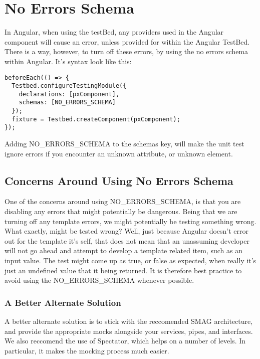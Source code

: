 \chapter{ No Errors Schema }

In Angular, when using the testBed, any providers used in the Angular component
will cause an error, unless provided for within the Angular TestBed. There is a
way, however, to turn off these errors, by using the no errors schema within
Angular. It's syntax look like this:
\begin{lstlisting}
beforeEach(() => {
  Testbed.configureTestingModule({
    declarations: [pxComponent],
    schemas: [NO_ERRORS_SCHEMA]
  });
  fixture = Testbed.createComponent(pxComponent);
});
\end{lstlisting}

Adding NO_ERRORS_SCHEMA to the schemas key, will make the unit test ignore
errors if you encounter an unknown attribute, or unknown element.

\section{ Concerns Around Using No Errors Schema }
One of the concerns around using NO_ERRORS_SCHEMA, is that you are disabling
any errors that might potentially be dangerous. Being that we are turning off
any template errors, we might potentially be testing something wrong. What
exactly, might be tested wrong? Well, just because Angular doesn't error out
for the template it's self, that does not mean that an unassuming developer
will not go ahead and attempt to develop a template related item, such as an
input value. The test might come up as true, or false as expected, when really it's just an undefined value that it being returned. It is therefore best practice to avoid using the NO_ERRORS_SCHEMA whenever possible.

\subsection{A Better Alternate Solution}
A better alternate solution is to stick with the reccomended SMAG architecture,
and provide the appropriate mocks alongside your services, pipes, and
interfaces. We also reccomend the use of Spectator, which helps on a number of
levels. In particular, it makes the mocking process much easier. 
